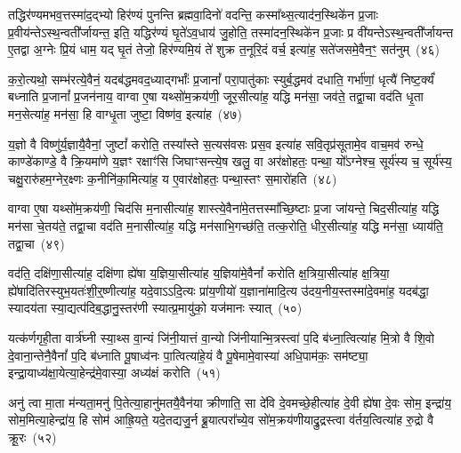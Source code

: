 {\anuvakamend[{निष्क्री॑णीष्व॒ दक्षि॑णाभिश्च वदन्ति॒ मन्य॑न्ते गन्ध॒र्वेभ्यो॑ ब॒हुत॑याः पिङ्गा॒क्ष्या दश॑ च}]}%

तद्धिर॑ण्यमभव॒त्तस्मा॑द॒द्भ्यो हिर॑ण्यं पुनन्ति ब्रह्मवा॒दिनो॑ वदन्ति॒ कस्मा᳚थ्स॒त्याद॑न॒स्थिके॑न प्र॒जाः प्र॒वीय॑न्ते\-ऽ\-स्थ॒न्वती᳚र्जायन्त॒ इति॒ यद्धिर॑ण्यं घृ॒ते॑\-ऽव॒धाय॑ जु॒होति॒ तस्मा॑दन॒स्थिके॑न प्र॒जाः प्र वी॑यन्ते\-ऽस्थ॒न्वती᳚र्जायन्त ए॒तद्वा अ॒ग्नेः प्रि॒यं धाम॒ यद् घृ॒तं तेजो॒ हिर॑ण्यमि॒यं ते॑ शुक्र त॒नूरि॒दं वर्च॒ इत्या॑ह॒ सते॑जसमे॒वैन॒ꣳ॒ सत॑नुम्~(४६)

क॒रो॒त्यथो॒ सम्भ॑रत्ये॒वैनं॒ यदब॑द्धमवद॒ध्याद्गर्भाः᳚ प्र॒जानां᳚ परा॒पातु॑काः स्युर्ब॒द्धमव॑ दधाति॒ गर्भा॑णां॒ धृत्यै॑ निष्ट॒र्क्यं॑ बध्नाति प्र॒जानां᳚ प्र॒जन॑नाय॒ वाग्वा ए॒षा यथ्सो॑म॒क्रय॑णी॒ जूर॒सीत्या॑ह॒ यद्धि मन॑सा॒ जव॑ते॒ तद्वा॒चा वद॑ति धृ॒ता मन॒सेत्या॑ह॒ मन॑सा॒ हि वाग्धृ॒ता जुष्टा॒ विष्ण॑व॒ इत्या॑ह~(४७)

य॒ज्ञो वै विष्णु॑र्य॒ज्ञायै॒वैनां॒ जुष्टां᳚ करोति॒ तस्या᳚स्ते स॒त्यस॑वसः प्रस॒व इत्या॑ह सवि॒तृप्र॑सूतामे॒व वाच॒मव॑ रुन्धे॒ काण्डे॑काण्डे॒ वै क्रि॒यमा॑णे य॒ज्ञꣳ रक्षाꣳ॑सि जिघाꣳसन्त्ये॒ष खलु॒ वा अर॑क्षोहतः॒ पन्था॒ यो᳚\-ऽग्नेश्च॒ सूर्य॑स्य च॒ सूर्य॑स्य॒ चक्षु॒रारु॑हम॒ग्नेर॒क्ष्णः क॒नीनि॑का॒मित्या॑ह॒ य ए॒वार॑क्षोहतः॒ पन्था॒स्तꣳ स॒मारो॑हति~(४८)

वाग्वा ए॒षा यथ्सो॑म॒क्रय॑णी॒ चिद॑सि म॒नासीत्या॑ह॒ शास्त्ये॒वैना॑मे॒तत्तस्मा᳚च्छि॒ष्टाः प्र॒जा जा॑यन्ते॒ चिद॒सीत्या॑ह॒ यद्धि मन॑सा चे॒तय॑ते॒ तद्वा॒चा वद॑ति म॒नासीत्या॑ह॒ यद्धि मन॑साभि॒गच्छ॑ति॒ तत्क॒रोति॒ धीर॒सीत्या॑ह॒ यद्धि मन॑सा॒ ध्याय॑ति॒ तद्वा॒चा~(४९)

वद॑ति॒ दक्षि॑णा॒सीत्या॑ह॒ दक्षि॑णा ह्ये॑षा य॒ज्ञिया॒सीत्या॑ह य॒ज्ञिया॑मे॒वैनां᳚ करोति क्ष॒त्रिया॒सीत्या॑ह क्ष॒त्रिया॒ ह्ये॑षादि॑तिरस्युभ॒यतः॑शी॒र्॒\mbox{}ष्णीत्या॑ह॒ यदे॒वा\-ऽऽ\-दि॒त्यः प्रा॑य॒णीयो॑ य॒ज्ञाना॑मादि॒त्य उ॑दय॒नीय॒स्तस्मा॑दे॒वमा॑ह॒ यदब॑द्धा॒ स्यादय॑ता स्या॒द्यत्प॑दिब॒द्धानु॒स्तर॑णी स्यात्प्र॒मायु॑को॒ यज॑मानः स्यात्~(५०)

यत्क॑र्णगृही॒ता वार्त्र॑घ्नी स्या॒थ्स वा॒न्यं जि॑नी॒यात्तं वा॒न्यो जि॑नीयान्मि॒त्रस्त्वा॑ प॒दि ब॑ध्ना॒त्वित्या॑ह मि॒त्रो वै शि॒वो दे॒वाना॒न्तेनै॒वैनां᳚ प॒दि ब॑ध्नाति पू॒षाध्व॑नः पा॒त्वित्या॑हे॒यं वै पू॒षेमामे॒वास्या॑ अधि॒पाम॑कः॒ सम॑ष्ट्या॒ इन्द्रा॒याध्य॑क्षा॒येत्या॒हेन्द्र॑मे॒वास्या॒ अध्य॑क्षं करोति~(५१)

अनु॑ त्वा मा॒ता म॑न्यता॒मनु॑ पि॒तेत्या॒हानु॑मतयै॒वैन॑या क्रीणाति॒ सा दे॑वि दे॒वमच्छे॒हीत्या॑ह दे॒वी ह्ये॑षा दे॒वः सोम॒ इन्द्रा॑य॒ सोम॒मित्या॒हेन्द्रा॑य॒ हि सोम॑ आह्रि॒यते॒ यदे॒तद्यजु॒र्न ब्रू॒यात्परा᳚च्ये॒व सो॑म॒क्रय॑णीयाद्रु॒द्रस्त्वा व॑र्तय॒त्वित्या॑ह रु॒द्रो वै क्रू॒रः~(५२)

